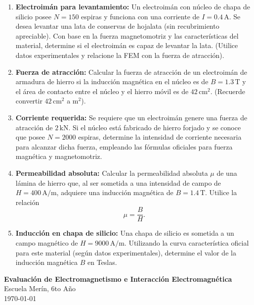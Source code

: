 \documentclass[a4paper,12pt]{article}
\begin{document}
\begin{enumerate}[label=\textbf{1.\arabic*}]
    \item \textbf{Electroimán para levantamiento:}  
    Un electroimán con núcleo de chapa de silicio posee $N=150$ espiras y funciona con una corriente de $I=0.4\,\mathrm{A}$. Se desea levantar una lata de conservas de hojalata (sin recubrimiento apreciable). Con base en la fuerza magnetomotriz y las características del material, determine si el electroimán es capaz de levantar la lata. (Utilice datos experimentales y relacione la FEM con la fuerza de atracción).

    \item \textbf{Fuerza de atracción:}  
    Calcular la fuerza de atracción de un electroimán de armadura de hierro si la inducción magnética en el núcleo es de $B=1.3\,\mathrm{T}$ y el área de contacto entre el núcleo y el hierro móvil es de $42\,\mathrm{cm}^2$. (Recuerde convertir $42\,\mathrm{cm}^2$ a $\mathrm{m}^2$).

    \item \textbf{Corriente requerida:}  
    Se requiere que un electroimán genere una fuerza de atracción de $2\,\mathrm{kN}$. Si el núcleo está fabricado de hierro forjado y se conoce que posee $N=2000$ espiras, determine la intensidad de corriente necesaria para alcanzar dicha fuerza, empleando las fórmulas oficiales para fuerza magnética y magnetomotriz.

    \item \textbf{Permeabilidad absoluta:}  
    Calcular la permeabilidad absoluta $\mu$ de una lámina de hierro que, al ser sometida a una intensidad de campo de $H=400\,\mathrm{A/m}$, adquiere una inducción magnética de $B=1.4\,\mathrm{T}$. Utilice la relación 
    \[
    \mu = \frac{B}{H}.
    \]

    \item \textbf{Inducción en chapa de silicio:}  
    Una chapa de silicio es sometida a un campo magnético de $H=9000\,\mathrm{A/m}$. Utilizando la curva característica oficial para este material (según datos experimentales), determine el valor de la inducción magnética $B$ en Teslas.
\end{enumerate}

\newpage
\begin{center}
    \Large \textbf{Evaluación de Electromagnetismo e Interacción Electromagnética} \\
    \large Escuela Merín, 6to Año \\
    \today
\end{center}
\vspace{1cm}
\end{document}
